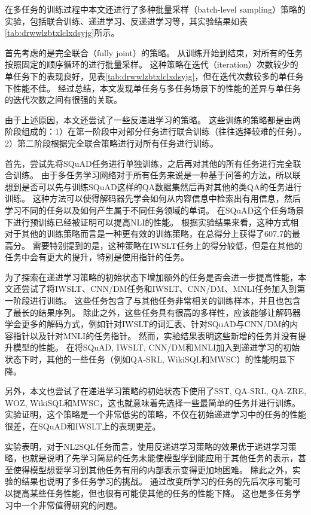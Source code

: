 在多任务的训练过程中本文还进行了多种批量采样（batch-level sampling）策略的实验，包括联合训练、递进学习、反递进学习等，其实验结果如表\ref{tab:drwwlzbtxlclxdsyjg}所示。

首先考虑的是完全联合（fully joint）的策略。
从训练开始到结束，对所有的任务按照固定的顺序循环的进行批量采样。
这种策略在迭代（iteration）次数较少的单任务下的表现良好，见表\ref{tab:drwwlzbtxlclxdsyjg}，但在迭代次数较多的单任务下性能不佳。
经过总结，本文发现单任务与多任务场景下的性能的差异与单任务的迭代次数之间有很强的关联。

由于上述原因，本文还尝试了一些反递进学习的策略\cite{Bengio2009Curriculum}。
这些训练的策略都是由两阶段组成的：1）在第一阶段中对部分任务进行联合训练（往往选择较难的任务）。2）第二阶段根据完全联合策略进行对所有任务进行训练。

首先，尝试先将SQuAD任务进行单独训练，之后再对其他的所有任务进行完全联合训练。
由于多任务学习网络对于所有任务来说是一种基于问答的方法，所以联想到是否可以先与训练SQuAD这样的QA数据集然后再对其他的类QA的任务进行训练。
这种方法可以使得解码器先学会如何从内容信息中检索出有用信息，然后学习不同的任务以及如何产生属于不同任务领域的单词。
在SQuAD这个任务场景下进行预训练已经被证明可以提高NLI的性能\cite{min2017question}。
根据实验结果来看，这种方式相对于其他的训练策略而言是一种更有效的训练策略，在总得分上获得了607.7的最高分。
需要特别提到的是，这种策略在IWSLT任务上的得分较低，但是在其他的任务中会有更大的提升，特别是使用指针的任务。

为了探索在递进学习策略的初始状态下增加额外的任务是否会进一步提高性能，本文还尝试了将IWSLT、CNN/DM任务和IWSLT、CNN/DM、MNLI任务加入到第一阶段进行训练。
这些任务包含了与其他任务非常相关的训练样本，并且也包含了最长的结果序列。
除此之外，这些任务具有很高的多样性，应该能够让解码器学会更多的解码方式，例如针对IWSLT的词汇表、针对SQuAD与CNN/DM的内容指针以及针对MNLI的任务指针。
然而，实验结果表明这些新增的任务并没有提升模型的性能。
在将SQuAD, IWSLT, CNN/DM和MNLI加入到递进学习的初始状态下时，其他的一些任务（例如QA-SRL, WikiSQL和MWSC）的性能明显下降。

另外，本文也尝试了在递进学习策略的初始状态下使用了SST, QA-SRL, QA-ZRE, WOZ, WikiSQL和MWSC，这也就意味着先选择一些最简单的任务并进行训练。
实验证明，这个策略是一个非常低劣的策略，不仅在初始递进学习中的任务的性能很差，在SQuAD和IWSLT上的表现更差。

实验表明，对于NL2SQL任务而言，使用反递进学习策略的效果优于递进学习策略，也就是说明了先学习简易的任务未能使模型学到能应用于其他任务的表示，甚至使得模型想要学习到其他任务有用的内部表示变得更加地困难。
除此之外，实验的结果也说明了多任务学习的挑战。
通过改变所学习的任务的先后次序可能可以提高某些任务性能，但也很有可能使其他的任务的性能下降。
这也是多任务学习中一个非常值得研究的问题。


